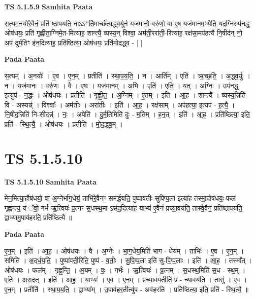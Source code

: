 \documentclass[17pt]{extarticle}
\begin{document}
\textbf{TS 5.1.5.9 } \newline
\textbf{Samhita Paata} \newline

स॒त्यम॒नयो॑रे॒वैनं॒ प्रति॑ ष्ठापयति॒ नाऽऽ*र्ति॒मार्च्छ॑त्यद्ध्व॒र्युर्न यज॑मानो॒ वरु॑णो॒ वा ए॒ष यज॑मानम॒भ्यैति॒ यद॒ग्निरुप॑नद्ध॒ ओष॑धयः॒ प्रति॑ गृह्णीता॒ग्निमे॒त-मित्या॑ह॒ शान्त्यै॒ व्यस्य॒न् विश्वा॒ अम॑ती॒ररा॑ती॒-रित्या॑ह॒ रक्ष॑सा॒मप॑हत्यै नि॒षीद॑न् नो॒ अप॑ दुर्म॒तिꣳ ह॑न॒दित्या॑ह॒ प्रति॑ष्ठित्या॒ ओष॑धयः॒ प्रति॑मोदद्ध्व - [  ] \newline

\textbf{Pada Paata} \newline

स॒त्यम् । अ॒नयोः᳚ । ए॒व । ए॒न॒म् । प्रतीति॑ । स्था॒प॒य॒ति॒ । न । आर्ति᳚म् । एति॑ । ऋ॒च्छ॒ति॒ । अ॒द्ध्व॒र्युः । न । यज॑मानः । वरु॑णः । वै । ए॒षः । यज॑मानम् । अ॒भि । एति॑ । ए॒ति॒ । यत् । अ॒ग्निः । उप॑नद्ध॒ इत्युप॑ - न॒द्धः॒ । ओष॑धयः । प्रतीति॑ । गृ॒ह्णी॒त॒ । अ॒ग्निम् । ए॒तम् । इति॑ । आ॒ह॒ । शान्त्यै᳚ । व्यस्य॒न्निति॑ वि - अस्यन्न्॑ । विश्वाः᳚ । अम॑तीः । अरा॑तीः । इति॑ । आ॒ह॒ । रक्ष॑साम् । अप॑हत्या॒ इत्यप॑ - ह॒त्यै॒ । नि॒षीद॒न्निति॑ नि-सीदन्न्॑ । नः॒ । अपेति॑ । दु॒र्म॒तिमिति॑ दुः - म॒तिम् । ह॒न॒त् । इति॑ । आ॒ह॒ । प्रति॑ष्ठित्या॒ इति॒ प्रति॑ - स्थि॒त्यै॒ । ओष॑धयः । प्रतीति॑ । मो॒द॒द्ध्व॒म् ।  \newline




\section*{ TS 5.1.5.10 }

\textbf{TS 5.1.5.10 } \newline
\textbf{Samhita Paata} \newline

मेन॒मित्या॒हौष॑धयो॒ वा अ॒ग्नेर्भा॑ग॒धेयं॒ ताभि॑रे॒वैनꣳ॒॒ सम॑र्द्धयति॒ पुष्पा॑वतीः सुपिप्प॒ला इत्या॑ह॒ तस्मा॒दोष॑धयः॒ फलं॑ गृह्णन्त्य॒ यं ॅवो॒ गर्भ॑ ऋ॒त्वियः॑ प्र॒त्नꣳ स॒धस्थ॒मा-ऽस॑द॒दित्या॑ह॒ याभ्य॑ ए॒वैनं॑ प्रच्या॒वय॑ति॒ तास्वे॒वैनं॒ प्रति॑ष्ठापयति॒ द्वाभ्या॑मु॒पाव॑हरति॒ प्रति॑ष्ठित्यै ॥ \newline

\textbf{Pada Paata} \newline

ए॒न॒म् । इति॑ । आ॒ह॒ । ओष॑धयः । वै । अ॒ग्नेः । भा॒ग॒धेय॒मिति॑ भाग - धेय᳚म् । ताभिः॑ । ए॒व । ए॒न॒म् । समिति॑ । अ॒द्‌र्ध॒य॒ति॒ । पुष्पा॑वती॒रिति॒ पुष्प॑ - व॒तीः॒ । सु॒पि॒प्प॒ला इति॑ सु-पि॒प्प॒लाः । इति॑ । आ॒ह॒ । तस्मा᳚त् । ओष॑धयः । फल᳚म् । गृ॒ह्ण॒न्ति॒ । अ॒यम् । वः॒ । गर्भः॑ । ऋ॒त्वियः॑ । प्र॒त्नम् । स॒धस्थ॒मिति॑ स॒ध - स्थ॒म् । एति॑ । अ॒स॒द॒त् । इति॑ । आ॒ह॒ । याभ्यः॑ । ए॒व । ए॒न॒म् । प्र॒च्या॒वय॒तीति॑ प्र - च्या॒वय॑ति । तासु॑ । ए॒व । ए॒न॒म् । प्रतीति॑ । स्था॒प॒य॒ति॒ । द्वाभ्या᳚म् । उ॒पाव॑हर॒तीत्यु॑प - अव॑हरति । प्रति॑ष्ठित्या॒ इति॒ प्रति॑ - स्थि॒त्यै॒ ॥  \newline
\end{document}
